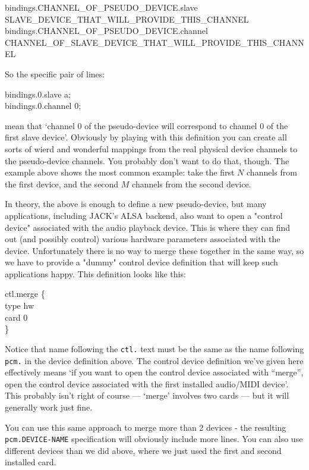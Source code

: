 \documentclass[10pt,a4paper]{book}
\begin{document}
\begin{enumerate}
\begin{itemize}
\begin{listing}
bindings.CHANNEL\_OF\_PSEUDO\_DEVICE.slave SLAVE\_DEVICE\_THAT\_WILL\_PROVIDE\_THIS\_CHANNEL\\
bindings.CHANNEL\_OF\_PSEUDO\_DEVICE.channel CHANNEL\_OF\_SLAVE\_DEVICE\_THAT\_WILL\_PROVIDE\_THIS\_CHANNEL
\end{listing}

So the specific pair of lines:

\begin{listing}
bindings.0.slave a;\\
bindings.0.channel 0;
\end{listing}

mean that `channel 0 of the pseudo-device will correspond to channel 0
of the first slave device'. Obviously by playing with this definition
you can create all sorts of wierd and wonderful mappings from the real
physical device channels to the pseudo-device channels. You probably
don't want to do that, though. The example above shows the most common
example: take the first $N$ channels from the first device, and the
second $M$ channels from the second device.

In theory, the above is enough to define a new pseudo-device, but many
applications, including JACK's ALSA backend, also want to open a
"control device" associated with the audio playback device. This is
where they can find out (and possibly control) various hardware
parameters associated with the device. Unfortunately there is no way
to merge these together in the same way, so we have to provide a
"dummy" control device definition that will keep such applications
happy. This definition looks like this:

\begin{listing}
ctl.merge \{\\
    type hw\\
    card 0\\
\}
\end{listing}

Notice that name following the \texttt{ctl.} text must be the same as
the name following \texttt{pcm.} in the device definition above. The
control device definition we've given here effectively means `if you
want to open the control device associated with ``merge'', open the
control device associated with the first installed audio/MIDI
device'. This probably isn't right of course --- `merge' involves two
cards --- but it will generally work just fine.

You can use this same approach to merge more than 2 devices - the
resulting \texttt{pcm.DEVICE-NAME} specification will obviously
include more lines. You can also use different devices than we did
above, where we just used the first and second installed card.


\end{itemize}
\end{enumerate}
\end{document}
